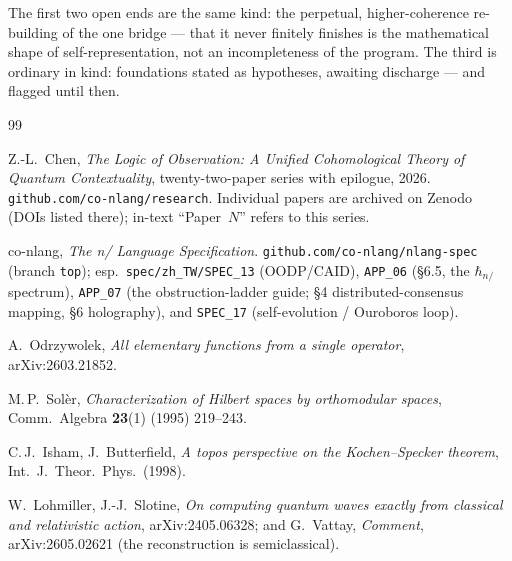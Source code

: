 \documentclass[11pt,a4paper]{article}
\newcommand{\hbarn}{\hbar_{n/}}
\theoremstyle{plain}
\theoremstyle{definition}
\theoremstyle{remark}
\begin{document}
The first two open ends are the same kind: the perpetual, higher-coherence
re-building of the one bridge --- that it never finitely finishes is the
mathematical shape of self-representation, not an incompleteness of the
program. The third is ordinary in kind: foundations stated as hypotheses,
awaiting discharge --- and flagged until then.

\begin{thebibliography}{99}
\small

 Z.-L.\ Chen, \emph{The Logic of Observation: A Unified
Cohomological Theory of Quantum Contextuality}, twenty-two-paper series with
epilogue, 2026. \texttt{github.com/co-nlang/research}. Individual papers are
archived on Zenodo (DOIs listed there); in-text ``Paper~$N$'' refers to this
series.

 co-nlang, \emph{The n/ Language Specification}.
\texttt{github.com/co-nlang/nlang-spec} (branch \texttt{top}); esp.\
\texttt{spec/zh\_TW/SPEC\_13} (OODP/CAID), \texttt{APP\_06} (\S6.5, the $\hbarn$
spectrum), \texttt{APP\_07} (the obstruction-ladder guide; \S4 distributed-consensus
mapping, \S6 holography), and \texttt{SPEC\_17} (self-evolution / Ouroboros loop).

 A.\ Odrzywolek, \emph{All elementary functions from a single
operator}, arXiv:2603.21852.

 M.\,P.\ Sol\`er, \emph{Characterization of Hilbert spaces by
orthomodular spaces}, Comm.\ Algebra \textbf{23}(1) (1995) 219--243.

 C.\,J.\ Isham, J.\ Butterfield, \emph{A topos perspective on the
Kochen--Specker theorem}, Int.\ J.\ Theor.\ Phys.\ (1998).

 W.\ Lohmiller, J.-J.\ Slotine, \emph{On computing quantum waves
exactly from classical and relativistic action}, arXiv:2405.06328; and G.\
Vattay, \emph{Comment}, arXiv:2605.02621 (the reconstruction is semiclassical).

\end{thebibliography}
\end{document}
